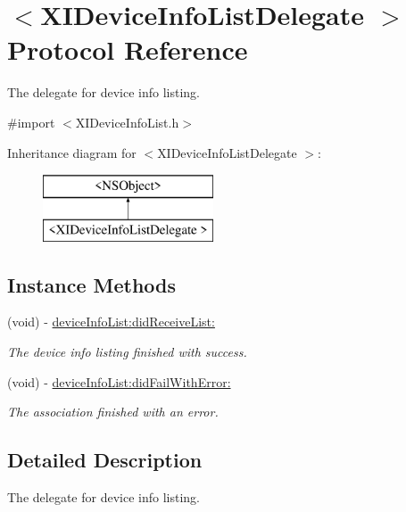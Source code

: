 \hypertarget{protocol_x_i_device_info_list_delegate_01-p}{}\section{$<$X\+I\+Device\+Info\+List\+Delegate $>$ Protocol Reference}
\label{protocol_x_i_device_info_list_delegate_01-p}


The delegate for device info listing.  




{\ttfamily \#import $<$X\+I\+Device\+Info\+List.\+h$>$}

Inheritance diagram for $<$X\+I\+Device\+Info\+List\+Delegate $>$\+:\begin{figure}[H]
\begin{center}
\leavevmode
\includegraphics[height=2.000000cm]{protocol_x_i_device_info_list_delegate_01-p}
\end{center}
\end{figure}
\subsection*{Instance Methods}
\begin{DoxyCompactItemize}
\item 
(void) -\/ \hyperlink{protocol_x_i_device_info_list_delegate_01-p_a7e959da1858b5767ad82a44926c9127b}{device\+Info\+List\+:did\+Receive\+List\+:}
\begin{DoxyCompactList}\small\item\em The device info listing finished with success. \end{DoxyCompactList}\item 
(void) -\/ \hyperlink{protocol_x_i_device_info_list_delegate_01-p_af5a6ce6f7dda877c7e3282a3f78ccafe}{device\+Info\+List\+:did\+Fail\+With\+Error\+:}
\begin{DoxyCompactList}\small\item\em The association finished with an error. \end{DoxyCompactList}\end{DoxyCompactItemize}


\subsection{Detailed Description}
The delegate for device info listing. 

